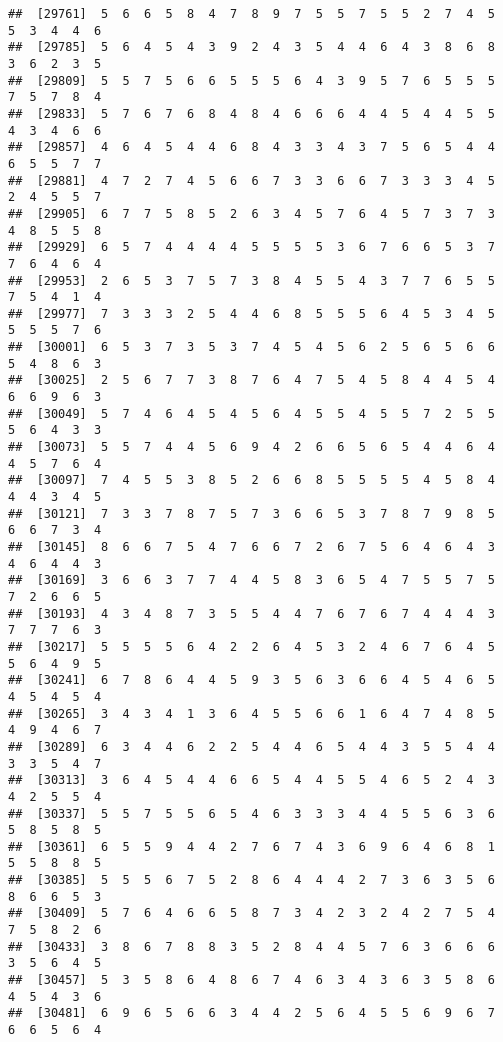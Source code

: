\documentclass[
]{book}
\begin{document}
\begin{verbatim}
##  [29761]  5  6  6  5  8  4  7  8  9  7  5  5  7  5  5  2  7  4  5  5  3  4  4  6
##  [29785]  5  6  4  5  4  3  9  2  4  3  5  4  4  6  4  3  8  6  8  3  6  2  3  5
##  [29809]  5  5  7  5  6  6  5  5  5  6  4  3  9  5  7  6  5  5  5  7  5  7  8  4
##  [29833]  5  7  6  7  6  8  4  8  4  6  6  6  4  4  5  4  4  5  5  4  3  4  6  6
##  [29857]  4  6  4  5  4  4  6  8  4  3  3  4  3  7  5  6  5  4  4  6  5  5  7  7
##  [29881]  4  7  2  7  4  5  6  6  7  3  3  6  6  7  3  3  3  4  5  2  4  5  5  7
##  [29905]  6  7  7  5  8  5  2  6  3  4  5  7  6  4  5  7  3  7  3  4  8  5  5  8
##  [29929]  6  5  7  4  4  4  4  5  5  5  5  3  6  7  6  6  5  3  7  7  6  4  6  4
##  [29953]  2  6  5  3  7  5  7  3  8  4  5  5  4  3  7  7  6  5  5  7  5  4  1  4
##  [29977]  7  3  3  3  2  5  4  4  6  8  5  5  5  6  4  5  3  4  5  5  5  5  7  6
##  [30001]  6  5  3  7  3  5  3  7  4  5  4  5  6  2  5  6  5  6  6  5  4  8  6  3
##  [30025]  2  5  6  7  7  3  8  7  6  4  7  5  4  5  8  4  4  5  4  6  6  9  6  3
##  [30049]  5  7  4  6  4  5  4  5  6  4  5  5  4  5  5  7  2  5  5  5  6  4  3  3
##  [30073]  5  5  7  4  4  5  6  9  4  2  6  6  5  6  5  4  4  6  4  4  5  7  6  4
##  [30097]  7  4  5  5  3  8  5  2  6  6  8  5  5  5  5  4  5  8  4  4  4  3  4  5
##  [30121]  7  3  3  7  8  7  5  7  3  6  6  5  3  7  8  7  9  8  5  6  6  7  3  4
##  [30145]  8  6  6  7  5  4  7  6  6  7  2  6  7  5  6  4  6  4  3  4  6  4  4  3
##  [30169]  3  6  6  3  7  7  4  4  5  8  3  6  5  4  7  5  5  7  5  7  2  6  6  5
##  [30193]  4  3  4  8  7  3  5  5  4  4  7  6  7  6  7  4  4  4  3  7  7  7  6  3
##  [30217]  5  5  5  5  6  4  2  2  6  4  5  3  2  4  6  7  6  4  5  5  6  4  9  5
##  [30241]  6  7  8  6  4  4  5  9  3  5  6  3  6  6  4  5  4  6  5  4  5  4  5  4
##  [30265]  3  4  3  4  1  3  6  4  5  5  6  6  1  6  4  7  4  8  5  4  9  4  6  7
##  [30289]  6  3  4  4  6  2  2  5  4  4  6  5  4  4  3  5  5  4  4  3  3  5  4  7
##  [30313]  3  6  4  5  4  4  6  6  5  4  4  5  5  4  6  5  2  4  3  4  2  5  5  4
##  [30337]  5  5  7  5  5  6  5  4  6  3  3  3  4  4  5  5  6  3  6  5  8  5  8  5
##  [30361]  6  5  5  9  4  4  2  7  6  7  4  3  6  9  6  4  6  8  1  5  5  8  8  5
##  [30385]  5  5  5  6  7  5  2  8  6  4  4  4  2  7  3  6  3  5  6  8  6  6  5  3
##  [30409]  5  7  6  4  6  6  5  8  7  3  4  2  3  2  4  2  7  5  4  7  5  8  2  6
##  [30433]  3  8  6  7  8  8  3  5  2  8  4  4  5  7  6  3  6  6  6  3  5  6  4  5
##  [30457]  5  3  5  8  6  4  8  6  7  4  6  3  4  3  6  3  5  8  6  4  5  4  3  6
##  [30481]  6  9  6  5  6  6  3  4  4  2  5  6  4  5  5  6  9  6  7  6  6  5  6  4

\end{verbatim}
\end{document}
